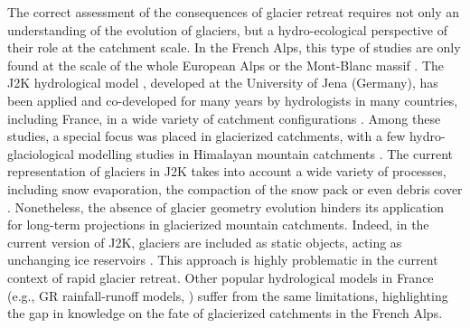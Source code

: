 The correct assessment of the consequences of glacier retreat requires not only an understanding of the evolution of glaciers, but a hydro-ecological perspective of their role at the catchment scale. In the French Alps, this type of studies are only found at the scale of the whole European Alps \citep{coppola_impact_2018} or the Mont-Blanc massif \citep{laurent_impact_2020}. The J2K hydrological model \citep{krause_quantifying_2002}, developed at the University of Jena (Germany), has been applied and co-developed for many years by hydrologists in many countries, including France, in a wide variety of catchment configurations \citep{branger_investigating_2012, braud_j2000-rhone_2017, horner_information_2020}. Among these studies, a special focus was placed in glacierized catchments, with a few hydro-glaciological modelling studies in Himalayan mountain catchments \citep{gao_test_2012, nepal_understanding_2014}. The current representation of glaciers in J2K takes into account a wide variety of processes, including snow evaporation, the compaction of the snow pack or even debris cover \citep{nepal_understanding_2014}. Nonetheless, the absence of glacier geometry evolution hinders its application for long-term projections in glacierized mountain catchments. Indeed, in the current version of J2K, glaciers are included as static objects, acting as unchanging ice reservoirs \citep{nepal_understanding_2014}. This approach is highly problematic in the current context of rapid glacier retreat.  Other popular hydrological models in France (e.g., GR rainfall-runoff models, \cite{coron_suite_2017}) suffer from the same limitations, highlighting the gap in knowledge on the fate of glacierized catchments in the French Alps. 

